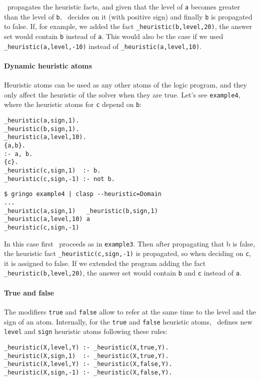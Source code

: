 \clasp\ propagates the heuristic facts, and given that the level of \texttt{a} becomes greater than the level of \texttt{b}, 
\clasp\ decides on it (with positive sign) and finally \texttt{b} is propagated to false. 
If, for example, we added the fact \texttt{\_heuristic(b,level,20)},  the answer set would contain \texttt{b} instead of \texttt{a}. 
This would also be the case if we used \texttt{\_heuristic(a,level,-10)} instead of \texttt{\_heuristic(a,level,10)}.  

\paragraph{Dynamic heuristic atoms}

Heuristic atoms can be used as any other atoms of the logic program, 
and they only affect the heuristic of the solver when they are true. 
Let's see \texttt{example4}, where the heuristic atoms for \texttt{c} depend on \texttt{b}: 
\begin{verbatim}
_heuristic(a,sign,1).
_heuristic(b,sign,1).
_heuristic(a,level,10).
{a,b}.
:- a, b.
{c}.
_heuristic(c,sign,1)  :- b.
_heuristic(c,sign,-1) :- not b.
\end{verbatim}
\begin{verbatim}
$ gringo example4 | clasp --heuristic=Domain                                                                                  
...
_heuristic(a,sign,1)   _heuristic(b,sign,1) 
_heuristic(a,level,10) a
_heuristic(c,sign,-1)\end{verbatim}

In this case first \clasp\ proceeds as in \texttt{example3}.  
Then after propagating that b is false,  the heuristic fact \texttt{\_heuristic(c,sign,-1)} is propagated, 
so when deciding on \texttt{c}, it is assigned to false.  If we extended the program adding the fact \texttt{\_heuristic(b,level,20)}, 
the answer set would contain \texttt{b} and \texttt{c} instead of \texttt{a}.  

\paragraph{True and false}

 The modifiers \texttt{true} and \texttt{false} allow to refer at the same time to the level and the sign of an atom. 
 Internally,  for the \texttt{true} and \texttt{false} heuristic atoms, 
 \clasp\ defines new \texttt{level} and \texttt{sign} heuristic atoms following these rules: 
\begin{verbatim}
_heuristic(X,level,Y) :- _heuristic(X,true,Y).
_heuristic(X,sign,1)  :- _heuristic(X,true,Y).
_heuristic(X,level,Y) :- _heuristic(X,false,Y).
_heuristic(X,sign,-1) :- _heuristic(X,false,Y).
\end{verbatim}

